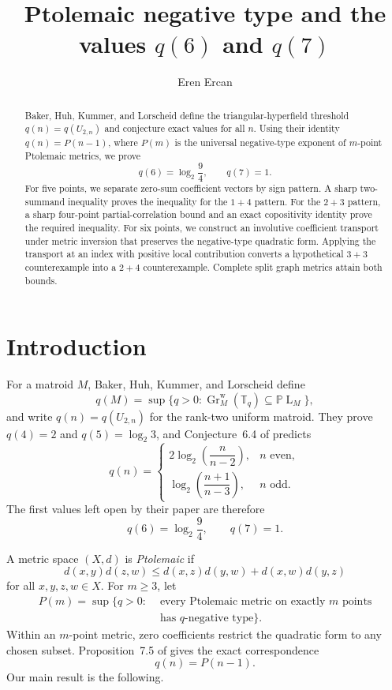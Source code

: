 \documentclass[11pt]{amsart}
\title[Ptolemaic negative type and $q(6),q(7)$]
{Ptolemaic negative type and the values $q(6)$ and $q(7)$}
\author{Eren Ercan}
\date{}
\theoremstyle{definition}
\theoremstyle{remark}
\newcommand{\T}{\mathbb T}
\newcommand{\Gr}{\operatorname{Gr}}
\newcommand{\PL}{\mathbb P\operatorname{L}}
\begin{document}
\begin{abstract}
Baker, Huh, Kummer, and Lorscheid define the triangular-hyperfield
threshold $q(n)=q(U_{2,n})$ and conjecture exact values for all $n$.
Using their identity $q(n)=P(n-1)$, where $P(m)$ is the universal
negative-type exponent of $m$-point Ptolemaic metrics, we prove
\[
 q(6)=\log_2\frac94,
 \qquad
 q(7)=1.
\]
For five points, we separate zero-sum coefficient vectors by sign
pattern. A sharp two-summand inequality proves the inequality for the
$1+4$ pattern. For the $2+3$ pattern, a sharp four-point partial-correlation
bound and an exact copositivity identity prove the required inequality.
For six points, we construct an involutive coefficient transport under
metric inversion that preserves the negative-type quadratic form. Applying
the transport at an index with positive local contribution converts a
hypothetical $3+3$ counterexample into a $2+4$ counterexample. Complete split graph metrics attain both bounds.
\end{abstract}

\maketitle

\section{Introduction}

For a matroid $M$, Baker, Huh, Kummer, and Lorscheid define
\[
 q(M)=\sup\{q>0: \Gr_M^{\mathrm w}(\T_q)\subseteq\PL_M\},
\]
and write $q(n)=q(U_{2,n})$ for the rank-two uniform matroid.  They prove
$q(4)=2$ and $q(5)=\log_2 3$, and Conjecture~6.4 of \cite{BHKL}
predicts
\begin{equation}\label{eq:BHKL-conjecture}
 q(n)=
 \begin{cases}
  2\log_2\!\left(\dfrac{n}{n-2}\right),&n\text{ even},\\[2mm]
  \log_2\!\left(\dfrac{n+1}{n-3}\right),&n\text{ odd}.
 \end{cases}
\end{equation}
The first values left open by their paper are therefore
\[
 q(6)=\log_2\frac94,
 \qquad
 q(7)=1.
\]

A metric space $(X,d)$ is \emph{Ptolemaic} if
\begin{equation}\label{eq:ptolemy-definition}
 d(x,y)d(z,w)
 \le d(x,z)d(y,w)+d(x,w)d(y,z)
\end{equation}
for all $x,y,z,w\in X$. For $m\ge3$, let
\begin{equation}\label{eq:P-definition}
 \begin{split}
 P(m)=\sup\{q>0:{}&\text{ every Ptolemaic metric on exactly $m$ points}\\
                  &\text{ has $q$-negative type}\}.
 \end{split}
\end{equation}
Within an $m$-point metric, zero coefficients restrict the quadratic form
to any chosen subset. Proposition~7.5 of \cite{BHKL}
gives the exact correspondence
\begin{equation}\label{eq:correspondence}
 q(n)=P(n-1).
\end{equation}
Our main result is the following.
\end{document}
